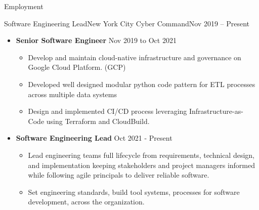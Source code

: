 \documentclass[]{mcdowellcv}
\begin{document}
    \makeheader

    \begin{cvsection}{Employment}
        \begin{cvsubsection}{Software Engineering Lead}{New York City Cyber Command}{Nov 2019 – Present}
          \begin{itemize}
                \item \textbf{Senior Software Engineer} Nov 2019 to Oct 2021
                    \begin{itemize}
                            \item Develop and maintain cloud-native infrastructure and governance on Google Cloud Platform. (GCP)
                            \item Developed well designed modular python code pattern for ETL processes across multiple data systems
                            \item Design and implemented CI/CD process leveraging Infrastructure-as-Code using Terraform and CloudBuild.
                    \end{itemize}
                \item \textbf{Software Engineering Lead}  Oct 2021 - Present
                    \begin{itemize}
                            \item Lead engineering teams full lifecycle from requirements, technical design, and implementation keeping stakeholders and project managers informed while following agile principals to deliver reliable software.
                            \item Set engineering standards, build tool systems, processes for software development, across the organization. 
                    \end{itemize}
                \end{itemize}
        \end{cvsubsection}


\end{cvsection}
\end{document}
